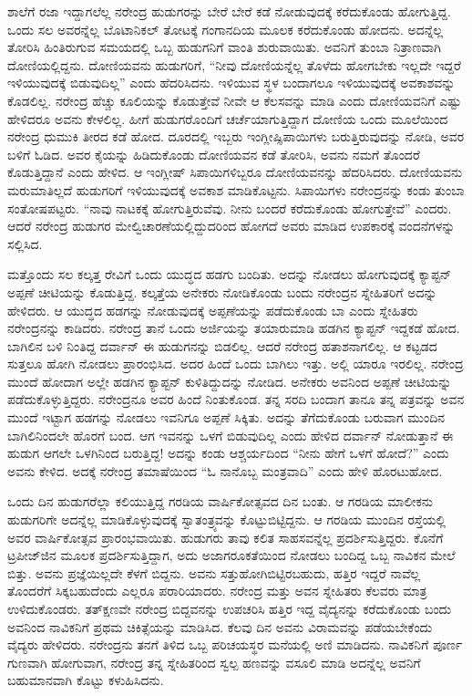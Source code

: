 ಶಾಲೆಗೆ ರಜಾ ಇದ್ದಾಗಲೆಲ್ಲ ನರೇಂದ್ರ ಹುಡುಗರನ್ನು ಬೇರೆ ಬೇರೆ ಕಡೆ ನೋಡುವುದಕ್ಕೆ ಕರೆದುಕೊಂಡು ಹೋಗುತ್ತಿದ್ದ. ಒಂದು ಸಲ ಅವರನ್ನೆಲ್ಲ ಬೊಟಾನಿಕಲ್ ತೋಟಕ್ಕೆ ಗಂಗಾನದಿಯ ಮೂಲಕ ಕರೆದುಕೊಂಡು ಹೋದನು. ಅದನ್ನೆಲ್ಲ ತೋರಿಸಿ ಹಿಂತಿರುಗುವ ಸಮಯದಲ್ಲಿ ಒಬ್ಬ ಹುಡುಗನಿಗೆ ವಾಂತಿ ಶುರುವಾಯಿತು. ಅವನಿಗೆ ತುಂಬಾ ನಿತ್ರಾಣವಾಗಿ ದೋಣಿಯಲ್ಲಿದ್ದನು. ದೋಣಿಯವನು ಹುಡುಗರಿಗೆ, “ನೀವು ದೋಣಿಯನ್ನೆಲ್ಲ ತೊಳೆದು ಹೋಗಬೇಕು ಇಲ್ಲದೇ ಇದ್ದರೆ ಇಳಿಯುವುದಕ್ಕೆ ಬಿಡುವುದಿಲ್ಲ” ಎಂದು ಹೆದರಿಸಿದನು. ಇಳಿಯುವ ಸ್ಥಳ ಬಂದಾಗಲೂ ಇಳಿಯುವುದಕ್ಕೆ ಅವಕಾಶವನ್ನು ಕೊಡಲಿಲ್ಲ. ನರೇಂದ್ರ ಹೆಚ್ಚು ಕೂಲಿಯನ್ನು ಕೊಡುತ್ತೇವೆ ನೀವೇ ಆ ಕೆಲಸವನ್ನು ಮಾಡಿ ಎಂದು ದೋಣಿಯವನಿಗೆ ಎಷ್ಟು ಹೇಳಿದರೂ ಅವನು ಕೇಳಲಿಲ್ಲ. ಹೀಗೆ ಹುಡುಗರೊಂದಿಗೆ ಚರ್ಚೆಯಾಗುತ್ತಿದ್ದಾಗ ದೋಣಿಯ ಒಂದು ಮೂಲೆಯಿಂದ ನರೇಂದ್ರ ಧುಮುಕಿ ತೀರದ ಕಡೆ ಹೋದ. ದೂರದಲ್ಲಿ ಇಬ್ಬರು ಇಂಗ್ಲೀಷ್\break ಸಿಪಾಯಿಗಳು ಬರುತ್ತಿರುವುದನ್ನು ನೋಡಿ, ಅವರ ಬಳಿಗೆ ಓಡಿದ. ಅವರ ಕೈಯನ್ನು ಹಿಡಿದುಕೊಂಡು ದೋಣಿಯವನ ಕಡೆ ತೋರಿಸಿ, ಅವನು ನಮಗೆ ತೊಂದರೆ ಕೊಡುತ್ತಿದ್ದಾನೆ ಎಂದು ಹೇಳಿದ. ಆ ಇಂಗ್ಲೀಷ್ ಸಿಪಾಯಿಗಳಿಬ್ಬರೂ ದೋಣಿಯವನನ್ನು ಹೆದರಿಸಿದರು. ದೋಣಿಯವನು ಮರುಮಾತಿಲ್ಲದೆ ಹುಡುಗರಿಗೆ ಇಳಿಯುವುದಕ್ಕೆ ಅವಕಾಶ ಮಾಡಿಕೊಟ್ಟನು. ಸಿಪಾಯಿಗಳು ನರೇಂದ್ರನನ್ನು ಕಂಡು ತುಂಬಾ ಸಂತೋಷಪಟ್ಟರು. “ನಾವು ನಾಟಕಕ್ಕೆ ಹೋಗುತ್ತಿರುವೆವು. ನೀನು ಬಂದರೆ ಕರೆದುಕೊಂಡು ಹೋಗುತ್ತೇವೆ” ಎಂದರು. ಆದರೆ ನರೇಂದ್ರ ಹುಡುಗರ ಮೇಲ್ವಿಚಾರಣೆಯಲ್ಲಿದ್ದುದರಿಂದ ಹೋಗದೆ ಅವರು ಮಾಡಿದ ಉಪಕಾರಕ್ಕೆ ವಂದನೆಗಳನ್ನು ಸಲ್ಲಿಸಿದ.

ಮತ್ತೊಂದು ಸಲ ಕಲ್ಕತ್ತ ರೇವಿಗೆ ಒಂದು ಯುದ್ಧದ ಹಡಗು ಬಂದಿತು. ಅದನ್ನು ನೋಡಲು ಹೋಗುವುದಕ್ಕೆ ಕ್ಯಾಪ್ಟನ್ ಅಪ್ಪಣೆ ಚೀಟಿಯನ್ನು ಕೊಡುತ್ತಿದ್ದ. ಕಲ್ಕತ್ತೆಯ ಅನೇಕರು ನೋಡಿಕೊಂಡು ಬಂದು ನರೇಂದ್ರನ ಸ್ನೇಹಿತರಿಗೆ ಅದನ್ನು ಹೇಳಿದರು. ಆ ಯುದ್ಧದ ಹಡಗನ್ನು ನೋಡುವುದಕ್ಕೆ ಅಪ್ಪಣೆಯನ್ನು ಪಡೆದುಕೊಂಡು ಬಾ ಎಂದು ಸ್ನೇಹಿತರು ನರೇಂದ್ರನನ್ನು ಕಾಡಿದರು. ನರೇಂದ್ರ ತಾನೆ ಒಂದು ಅರ್ಜಿಯನ್ನು ತಯಾರುಮಾಡಿ ಹಡಗಿನ ಕ್ಯಾಪ್ಟನ್ ಇದ್ದಕಡೆ ಹೋದ. ಬಾಗಿಲಿನ ಬಳಿ ನಿಂತಿದ್ದ ದರ್ವಾನ್ ಈ ಹುಡುಗನನ್ನು ಬಿಡಲಿಲ್ಲ. ಆದರೆ ನರೇಂದ್ರ ಹತಾಶನಾಗಲಿಲ್ಲ. ಆ ಕಟ್ಟಡದ ಸುತ್ತಲೂ ಹೋಗಿ ನೋಡಲು ಪ್ರಾರಂಭಿಸಿದ. ಅದರ ಹಿಂದೆ ಒಂದು ಬಾಗಿಲು ಇತ್ತು. ಅಲ್ಲಿ ಯಾರೂ ಇರಲಿಲ್ಲ. ನರೇಂದ್ರ ಮುಂದೆ ಹೋದಾಗ ಅಲ್ಲೇ ಹಡಗಿನ ಕ್ಯಾಪ್ಟನ್ ಕುಳಿತಿದ್ದುದನ್ನು ನೋಡಿದ. ಅನೇಕರು ಅವನಿಂದ ಅಪ್ಪಣೆ ಚೀಟಿಯನ್ನು ಪಡೆದುಕೊಳ್ಳುತ್ತಿದ್ದರು. ನರೇಂದ್ರನೂ ಅವರ ಹಿಂದೆ ನಿಂತುಕೊಂಡ. ತನ್ನ ಸರದಿ ಬಂದಾಗ ತಾನೂ ತನ್ನ ಪತ್ರವನ್ನು ಅವನ ಮುಂದೆ ಇಟ್ಟಾಗ ಹಡಗನ್ನು ನೋಡಲು ಇವನಿಗೂ ಅಪ್ಪಣೆ ಸಿಕ್ಕಿತು. ಅದನ್ನು ತೆಗೆದುಕೊಂಡು ಬರುವಾಗ ಮುಂದಿನ ಬಾಗಿಲಿನಿಂದಲೇ ಹೊರಗೆ ಬಂದ. ಆಗ ಇವನನ್ನು ಒಳಗೆ ಬಿಡುವುದಿಲ್ಲ ಎಂದು ಹೇಳಿದ ದರ್ವಾನ್ ನೋಡುತ್ತಾನೆ ಈ ಹುಡುಗ ಆಗಲೇ ಒಳಗಿನಿಂದ ಬರುತ್ತಿದ್ದ! ಅದನ್ನು ಕಂಡು ಆಶ್ಚರ್ಯದಿಂದ “ನೀನು ಹೇಗೆ ಒಳಗೆ ಹೋದೆ?” ಎಂದು ಅವನು ಕೇಳಿದ. ಅದಕ್ಕೆ ನರೇಂದ್ರ ತಮಾಷೆಯಿಂದ “ಓ ನಾನೊಬ್ಬ ಮಂತ್ರವಾದಿ” ಎಂದು ಹೇಳಿ ಹೊರಟುಹೋದ.

ಒಂದು ದಿನ ಹುಡುಗರೆಲ್ಲಾ ಕಲಿಯುತ್ತಿದ್ದ ಗರಡಿಯ ವಾರ್ಷಿಕೋತ್ಸವದ ದಿನ ಬಂತು. ಆ ಗರಡಿಯ ಮಾಲೀಕನು ಹುಡುಗರಿಗೇ ಅದನ್ನೆಲ್ಲ ಮಾಡಿಕೊಳ್ಳುವುದಕ್ಕೆ ಸ್ವಾತಂತ್ರ್ಯವನ್ನು ಕೊಟ್ಟುಬಿಟ್ಟಿದ್ದನು. ಆ ಗರಡಿಯ ಮುಂದಿನ ರಸ್ತೆಯಲ್ಲಿ ಅವರ ವಾರ್ಷಿಕೋತ್ಸವ ಪ್ರಾರಂಭವಾಯಿತು. ಹುಡುಗರು ತಾವು ಕಲಿತ ಸಾಹಸವನ್ನೆಲ್ಲ ಪ್ರದರ್ಶಿಸುತ್ತಿದ್ದರು. ಕೊನೆಗೆ ಟ್ರಪೀಜ್​ಜಿನ ಮೂಲಕ ಪ್ರದರ್ಶಿಸುತ್ತಿದ್ದಾಗ, ಅದು ಅಜಾಗರೂಕತೆಯಿಂದ ನೋಡಲು ಬಂದಿದ್ದ ಒಬ್ಬ ನಾವಿಕನ ಮೇಲೆ ಬಿತ್ತು. ಅವನು ಪ್ರಜ್ಞೆಯಿಲ್ಲದೇ ಕೆಳಗೆ ಬಿದ್ದನು. ಅವನು ಸತ್ತುಹೋಗಿಬಿಟ್ಟಿರಬಹುದು, ಹತ್ತಿರ ಇದ್ದರೆ ನಾವೆಲ್ಲ ತೊಂದರೆಗೆ ಸಿಕ್ಕಬಹುದೆಂದು ಎಲ್ಲರೂ ಪರಾರಿಯಾದರು. ನರೇಂದ್ರ ಮತ್ತು ಅವನ ಸ್ನೇಹಿತರು ಕೆಲವರು ಮಾತ್ರ ಉಳಿದುಕೊಂಡರು. ತತ್‍ಕ್ಷಣವೇ ನರೇಂದ್ರ ಬಿದ್ದವನನ್ನು ಉಪಚರಿಸಿ ಹತ್ತಿರ ಇದ್ದ ವೈದ್ಯನನ್ನು ಕರೆದುಕೊಂಡು ಬಂದು ಅವನಿಂದ ನಾವಿಕನಿಗೆ ಪ್ರಥಮ ಚಿಕಿತ್ಸೆಯನ್ನು ಮಾಡಿಸಿದ. ಕೆಲವು ದಿನ ಅವನು ವಿರಾಮವನ್ನು ಪಡೆಯಬೇಕೆಂದು ವೈದ್ಯರು ಹೇಳಿದರು. ನರೇಂದ್ರನು ತನಗೆ ತಿಳಿದ ಒಬ್ಬ ಪರಿಚಯಸ್ಥರ ಮನೆಯಲ್ಲಿ ಅಣಿ ಮಾಡಿದನು. ನಾವಿಕನಿಗೆ ಪೂರ್ಣ ಗುಣವಾಗಿ ಹೋಗುವಾಗ, ನರೇಂದ್ರ ತನ್ನ ಸ್ನೇಹಿತರಿಂದ ಸ್ವಲ್ಪ ಹಣವನ್ನು ವಸೂಲಿ ಮಾಡಿ ಅದನ್ನೆಲ್ಲ ಅವನಿಗೆ ಬಹುಮಾನವಾಗಿ ಕೊಟ್ಟು ಕಳುಹಿಸಿದನು.

